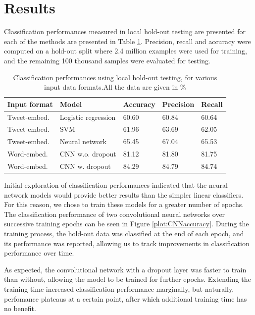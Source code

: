 \section{Results}
Classification performances measured in local hold-out testing are presented for each of the methods are presented in Table \ref{tab:results}. Precision, recall and accuracy were computed on a hold-out split where 2.4 million examples were used for training, and the remaining 100 thousand samples were evaluated for testing.

\begin{table}[h]
  \centering
  \begin{tabular}[c]{lllll}
    Input format&Model&Accuracy&Precision&Recall\\
    \hline
    Tweet-embed.&Logistic regression & 60.60 &    60.84   & 60.64  \\
    Tweet-embed.&SVM             & 61.96    &   63.69     & 62.05   \\
    Tweet-embed.&Neural network & 65.45	& 67.04	& 65.53	 \\
    Word-embed.&CNN w.o. dropout &  81.12  & 81.80	& 81.75	 \\
    Word-embed.&CNN w. dropout & 84.29 & 84.79 & 84.74 
    
  \end{tabular}
  \caption{Classification performances using local hold-out testing, for various input data formats.All the data are given in \%}
  \label{tab:results}
\end{table}

Initial exploration of classification performances indicated that the neural network models would provide better results than the simpler linear classifiers. For this reason, we chose to train these models for a greater number of epochs. The classification performance of two convolutional neural networks over successive training epochs can be seen in Figure \ref{plot:CNNaccuracy}. During the training process, the hold-out data was classified at the end of each epoch, and its performance was reported, allowing us to track improvements in classification performance over time.

As expected, the convolutional network with a dropout layer was faster to train than without, allowing the model to be trained for further epochs. Extending the training time increased classification performance marginally, but naturally, perfomance plateaus at a certain point, after which additional training time has no benefit.

